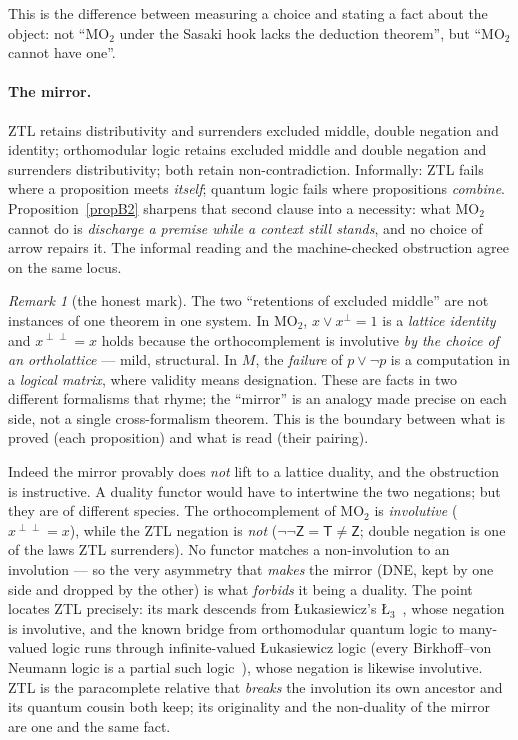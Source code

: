 \documentclass[11pt]{article}
\theoremstyle{remark}
\newtheorem*{rem}{Remark}
\newcommand{\T}{\mathsf{T}}
\newcommand{\Zmark}{\mathsf{Z}}
\begin{document}
This is the difference between measuring a choice and stating a fact about
the object: not ``$\mathrm{MO}_2$ under the Sasaki hook lacks the deduction
theorem'', but ``$\mathrm{MO}_2$ cannot have one''.

\paragraph{The mirror.} ZTL retains distributivity and surrenders excluded
middle, double negation and identity; orthomodular logic retains excluded
middle and double negation and surrenders distributivity; both retain
non-contradiction. Informally: ZTL fails where a proposition meets
\emph{itself}; quantum logic fails where propositions \emph{combine}.
Proposition~\ref{propB2} sharpens that second clause into a necessity: what
$\mathrm{MO}_2$ cannot do is \emph{discharge a premise while a context still
stands}, and no choice of arrow repairs it. The informal reading and the
machine-checked obstruction agree on the same locus.

\begin{rem}[the honest mark]
The two ``retentions of excluded middle'' are not instances of one theorem in
one system. In $\mathrm{MO}_2$, $x \vee x^{\perp} = 1$ is a \emph{lattice
identity} and $x^{\perp\perp}=x$ holds because the orthocomplement is
involutive \emph{by the choice of an ortholattice} --- mild, structural. In
$M$, the \emph{failure} of $p \vee \neg p$ is a computation in a \emph{logical
matrix}, where validity means designation. These are facts in two different
formalisms that rhyme; the ``mirror'' is an analogy made precise on each side,
not a single cross-formalism theorem. This is the boundary between what is
proved (each proposition) and what is read (their pairing).

Indeed the mirror provably does \emph{not} lift to a lattice duality, and the
obstruction is instructive. A duality functor would have to intertwine the two
negations; but they are of different species. The orthocomplement of
$\mathrm{MO}_2$ is \emph{involutive} ($x^{\perp\perp}=x$), while the ZTL
negation is \emph{not} ($\neg\neg\Zmark = \T \neq \Zmark$; double negation is
one of the laws ZTL surrenders). No functor matches a non-involution to an
involution --- so the very asymmetry that \emph{makes} the mirror (DNE, kept by
one side and dropped by the other) is what \emph{forbids} it being a duality.
The point locates ZTL precisely: its mark descends from {\L}ukasiewicz's
$\text{{\L}}_3$~\cite{lukasiewicz}, whose negation is involutive, and the known
bridge from orthomodular quantum logic to many-valued logic runs through
infinite-valued {\L}ukasiewicz logic (every Birkhoff--von Neumann logic is a
partial such logic~\cite{pykacz}), whose negation is likewise involutive. ZTL
is the paracomplete relative that \emph{breaks} the involution its own ancestor
and its quantum cousin both keep; its originality and the non-duality of the
mirror are one and the same fact.
\end{rem}
\end{document}
